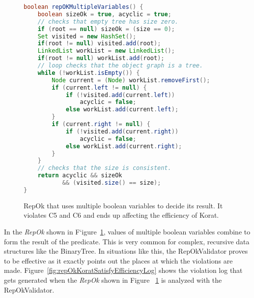 \begin{figure}
\centering
\begin{lstlisting}[language=Java]
boolean repOKMultipleVariables() {
    boolean sizeOk = true, acyclic = true;
    // checks that empty tree has size zero.
    if (root == null) sizeOk = (size == 0);
    Set visited = new HashSet();
    if(root != null) visited.add(root);
    LinkedList workList = new LinkedList();
    if(root != null) workList.add(root);
    // loop checks that the object graph is a tree.
    while (!workList.isEmpty()) {
        Node current = (Node) workList.removeFirst();
        if (current.left != null) {
            if (!visited.add(current.left)) 
                acyclic = false;
            else workList.add(current.left);
        }
        if (current.right != null) {
            if (!visited.add(current.right)) 
                acyclic = false;
            else workList.add(current.right);
        }
    }
    // checks that the size is consistent.
    return acyclic && sizeOk 
           && (visited.size() == size);  
}
\end{lstlisting}
\caption{RepOk that uses multiple boolean variables to decide its result. It violates C5 and C6 and ends up affecting the efficiency of Korat.}
\label{fig:repOkMultipleBooleanVariables}
\end{figure}

\para In the \emph{RepOk} shown in
F`igure~\ref{fig:repOkMultipleBooleanVariables}, values of multiple
boolean variables combine to form the result of the predicate. This is
very common for complex, recursive data structures like the
BinaryTree. In situations like this, the RepOkValidator proves to be
effective as it exactly points out the places at which the violations
are made. Figure~\ref{fig:repOkKoratSatisfyEfficiencyLog} shows the
violation log that gets generated when the \emph{RepOk} shown in
Figure~ \ref{fig:repOkMultipleBooleanVariables} is analyzed with the
RepOkValidator.

